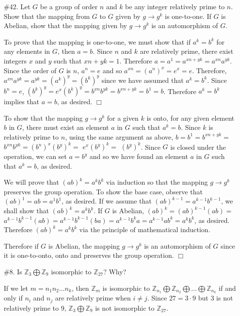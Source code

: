 \documentclass{article}
\newcommand{\Z}{\mathbb Z}
\begin{document}
\begin{enumerate}
    \item[\#42.] Let $G$ be a group of order $n$ and $k$ be any integer relatively prime to $n$. Show that the mapping from $G$ to $G$ given by $g \rightarrow g^k$ is one-to-one. If $G$ is Abelian, show that the mapping given by $g \rightarrow g^k$ is an automorphism of $G$.
    \begin{flushleft}
    To prove that the mapping is one-to-one, we must show that if $a^k = b^k$ for any elements in $G$, then $a = b$. Since $n$ and $k$ are relatively prime, there exist integers $x$ and $y$ such that $xn + yk = 1$. Therefore $a = a^1 = a^{xn + yk} = a^{xn}a^{yk}$. Since the order of $G$ is $n$, $a^n = e$ and so $a^{xn} = (a^n)^x = e^x = e$. Therefore, $a^{xn}a^{yk} = a^{yk} = (a^k)^y = (b^k)^y$ since we have assumed that $a^k = b^k$. Since $b^n = e$, $(b^k)^y = e^{x}(b^k)^y = b^{xn}b^{yk} = b^{xn + yk} = b^1 = b$. Therefore $a^k = b^k$ implies that $a = b$, as desired. $\Box$\newline
    
    To show that the mapping $g \rightarrow g^k$ for a given $k$ is onto, for any given element $b$ in $G$, there must exist an element $a$ in $G$ such that $a^k = b$. Since $k$ is relatively prime to $n$, using the same argument as above, $b = b^1 = b^{xn + yk} =$ $b^{xn}b^{yk} = (b^n)^x(b^y)^k =$ $e^x(b^y)^k =$ $(b^y)^k$. Since $G$ is closed under the operation, we can set $a = b^y$ and so we have found an element $a$ in $G$ such that $a^k = b$, as desired.\newline
    
    We will prove that $(ab)^k = a^kb^k$ via induction so that the mapping $g \rightarrow g^k$ preserves the group operation. To show the base case, observe that $(ab)^1 = ab = a^1b^1$, as desired. If we assume that $(ab)^{k-1} = a^{k-1}b^{k-1}$, we shall show that $(ab)^k = a^kb^k$. If $G$ is Abelian, $(ab)^k = (ab)^{k-1}(ab) = $ $a^{k-1}b^{k-1}(ab) = a^{k-1}b^{k-1}(ba) = a^{k-1}b^ka = a^{k-1}ab^k = a^kb^k$, as desired. Therefore $(ab)^k = a^kb^k$ via the principle of mathematical induction.\newline
    
    Therefore if $G$ is Abelian, the mapping $g \rightarrow g^k$ is an automorphism of $G$ since it is one-to-onto, onto and preserves the group operation. $\Box$
    \end{flushleft}
    
    \item[\#8.] Is $\Z_3 \bigoplus \Z_9$ isomorphic to $\Z_{27}$? Why?
    \begin{flushleft}
    If we let $m = n_1n_2 \ldots n_k$, then $\Z_m$ is isomorphic to $\Z_{n_1} \bigoplus \Z_{n_2} \bigoplus \ldots \bigoplus \Z_{n_k}$ if and only if $n_i$ and $n_j$ are relatively prime when $i \not= j$. Since $27 = 3 \cdot 9$ but 3 is not relatively prime to 9, $\Z_3 \bigoplus \Z_9$ is not isomorphic to $\Z_{27}$.
    \end{flushleft}
\end{enumerate}
\end{document}
